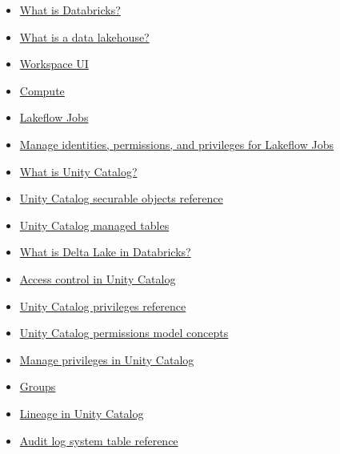 \begingroup\small
\begin{itemize}
\item \href{https://docs.databricks.com/aws/en/introduction/}{What is Databricks?}
\item \href{https://docs.databricks.com/aws/en/lakehouse/}{What is a data lakehouse?}
\item \href{https://docs.databricks.com/aws/en/workspace/}{Workspace UI}
\item \href{https://docs.databricks.com/aws/en/compute/}{Compute}
\item \href{https://docs.databricks.com/aws/en/jobs/}{Lakeflow Jobs}
\item \href{https://docs.databricks.com/aws/en/jobs/privileges}{Manage identities, permissions, and privileges for Lakeflow Jobs}
\item \href{https://docs.databricks.com/aws/en/data-governance/unity-catalog/}{What is Unity Catalog?}
\item \href{https://docs.databricks.com/aws/en/data-governance/unity-catalog/securable-objects}{Unity Catalog securable objects reference}
\item \href{https://docs.databricks.com/aws/en/tables/managed}{Unity Catalog managed tables}
\item \href{https://docs.databricks.com/aws/en/delta/}{What is Delta Lake in Databricks?}
\item \href{https://docs.databricks.com/aws/en/data-governance/unity-catalog/access-control/}{Access control in Unity Catalog}
\item \href{https://docs.databricks.com/aws/en/data-governance/unity-catalog/access-control/privileges-reference}{Unity Catalog privileges reference}
\item \href{https://docs.databricks.com/aws/en/data-governance/unity-catalog/access-control/permissions-concepts}{Unity Catalog permissions model concepts}
\item \href{https://docs.databricks.com/aws/en/data-governance/unity-catalog/manage-privileges/}{Manage privileges in Unity Catalog}
\item \href{https://docs.databricks.com/aws/en/admin/users-groups/groups}{Groups}
\item \href{https://docs.databricks.com/aws/en/data-governance/unity-catalog/data-lineage}{Lineage in Unity Catalog}
\item \href{https://docs.databricks.com/aws/en/admin/system-tables/audit-logs}{Audit log system table reference}
\end{itemize}
\endgroup
